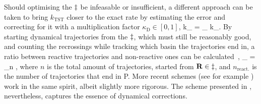 Should optimising the $\ddagger$ be infeasable or insufficient, a different approach can be taken to bring $k_\text{TST}$ closer to the exact rate by estimating the error and correcting for it with a multiplication factor $\kappa_\text{D} \in [0, 1]$,
k_ = \kappa_ \text{ } k_.
\eeq
By starting dynamical trajectories from the $\ddagger$, which must still be reasonably good, and counting the recrossings while tracking which basin the trajectories end in, a ratio between reactive trajectories and non-reactive ones can be calculated~\cite{dynamical-corrections-keck-1962},
\kappa_ = \lim_{n \rightarrow \infty} ,
\eeq
where $n$ is the total amount of trajectories, started from ${\mathrm{\mathbf{\bm{R}}}} \in \ddagger$, and $n_\text{react.}$ is the number of trajectories that end in P.
More recent schemes (see for example \cite{vtst-2005, dynamical-corrections-chandler-1977, dynamical-corrections-bennett-1977}) work in the same spirit, albeit slightly more rigorous.
The scheme presented in , nevertheless, captures the essence of dynamical corrections.
